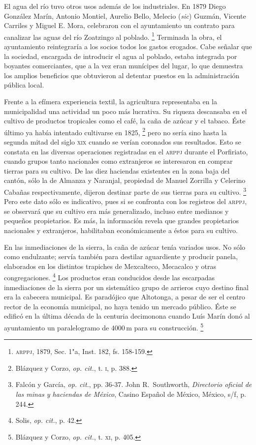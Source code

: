 \documentclass[14pt,twoside,final]{extbook} %
\let\oldfootnote\footnote
\renewcommand\footnote[1]{%
\oldfootnote{\hspace{1mm}#1}}
\begin{document}
El agua del río tuvo otros usos además de los industriales. En 1879 Diego González Marín, Antonio Montiel, Aurelio Bello, Melecio (\emph{sic}) Guzmán, Vicente Carriles y Miguel E. Mora, celebraron con el ayuntamiento un contrato para canalizar las aguas del río Zoatzingo al poblado.\footnote{\textsc{arppj}, 1879, Sec. 1"a, Inst. 182, fs. 158-159.} Terminada la obra, el ayuntamiento reintegraría a los socios todos los gastos erogados. Cabe señalar que la sociedad, encargada de introducir el agua al poblado, estaba integrada por boyantes comerciantes, que a la vez eran munícipes del lugar, lo que demuestra los amplios beneficios que obtuvieron al detentar puestos en la administración pública local.

Frente a la efímera experiencia textil, la agricultura representaba en la municipalidad una actividad un poco más lucrativa. Su riqueza descansaba en el cultivo de productos tropicales como el café, la caña de azúcar y el tabaco. Éste último ya había intentado cultivarse en 1825,\footnote{Blázquez y Corzo, \emph{op. cit.}, t. \textsc{i}, p. 388.} pero no sería sino hasta la segunda mitad del siglo \textsc{xix} cuando se verían coronados sus resultados. Esto se constata en las diversas operaciones registradas en el \textsc{arppj} durante el Porfiriato, cuando grupos tanto nacionales como extranjeros se interesaron en comprar tierras para su cultivo. De las diez haciendas
existentes en la zona baja del cantón, sólo la de Almanza y Naranjal, propiedad de Manuel Zorrilla y Celerino Cabañas respectivamente, dijeron destinar parte de sus tierras para su cultivo.\footnote{Falcón y García, \emph{op. cit.}, pp. 36-37. John R.~Southworth, \emph{Directorio oficial de las minas y haciendas de México}, Casino Español de México, México, s/f, p. 244.} Pero este dato sólo es indicativo, pues si se confronta con los registros del \textsc{arppj}, se observará que su cultivo era más generalizado, incluso entre medianos y pequeños propietarios. Es más, la información revela que grandes propietarios nacionales y extranjeros, habilitaban económicamente a éstos para su cultivo.

En las inmediaciones de la sierra, la caña de azúcar tenía variados usos. No sólo como endulzante; servía también para destilar aguardiente y producir panela, elaborados en los distintos trapiches de Mexcalteco, Mecacalco y otras congregaciones.\footnote{Solis, \emph{op. cit.}, p. 42.} Los productos eran conducidos desde las escarpadas inmediaciones de la sierra por un sistemático grupo de arrieros cuyo destino final era la cabecera municipal. Es paradójico que Altotonga, a pesar de ser el centro rector de la economía municipal, no haya tenido un mercado público. Éste se edificó en la última década de la centuria decimonona cuando Luís Marín donó al ayuntamiento un paralelogramo de 4000\,m para su construcción.\footnote{Blázquez y Corzo, \emph{op. cit.}, t. \textsc{xi}, p. 405.}
\end{document}
